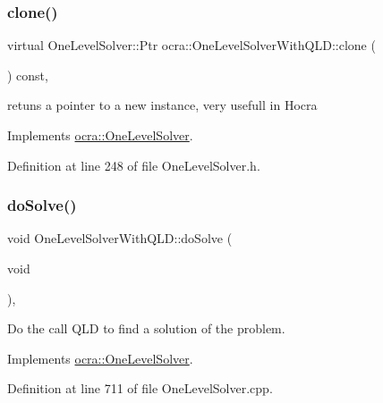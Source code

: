\subsubsection{\texorpdfstring{clone()}{clone()}}
{\footnotesize\ttfamily virtual One\+Level\+Solver\+::\+Ptr ocra\+::\+One\+Level\+Solver\+With\+Q\+L\+D\+::clone (\begin{DoxyParamCaption}{ }\end{DoxyParamCaption}) const\hspace{0.3cm}{\ttfamily [inline]}, {\ttfamily [virtual]}}

retuns a pointer to a new instance, very usefull in Hocra 

Implements \hyperlink{classocra_1_1OneLevelSolver_a08ecd92d4295e03aa03075a71d481f48}{ocra\+::\+One\+Level\+Solver}.



Definition at line 248 of file One\+Level\+Solver.\+h.

\hypertarget{classocra_1_1OneLevelSolverWithQLD_ac7cce5bd375142ca0c74cd71300b15a5}{}\label{classocra_1_1OneLevelSolverWithQLD_ac7cce5bd375142ca0c74cd71300b15a5} 
\subsubsection{\texorpdfstring{do\+Solve()}{doSolve()}}
{\footnotesize\ttfamily void One\+Level\+Solver\+With\+Q\+L\+D\+::do\+Solve (\begin{DoxyParamCaption}\item[{void}]{ }\end{DoxyParamCaption})\hspace{0.3cm}{\ttfamily [protected]}, {\ttfamily [virtual]}}

Do the call Q\+LD to find a solution of the problem. 

Implements \hyperlink{classocra_1_1OneLevelSolver_aeb4fb349df382921c5c0064d7a05c48b}{ocra\+::\+One\+Level\+Solver}.



Definition at line 711 of file One\+Level\+Solver.\+cpp.

\hypertarget{classocra_1_1OneLevelSolverWithQLD_abc304c0e5f9234ca4230f7b67b02a0c0}{}\label{classocra_1_1OneLevelSolverWithQLD_abc304c0e5f9234ca4230f7b67b02a0c0} 
